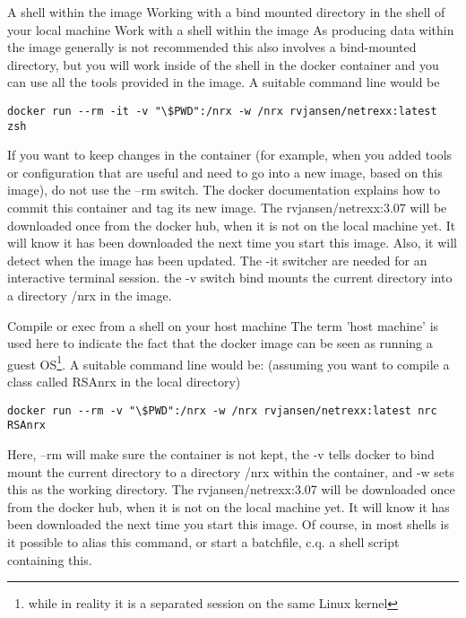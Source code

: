 A shell within the image
Working with a bind mounted directory in the shell of your local machine
Work with a shell within the image
As producing data within the image generally is not recommended this also involves a bind-mounted directory, but you will work inside of the shell in the docker container and you can use all the tools provided in the image. 
A suitable command line would be
\begin{verbatim}
docker run --rm -it -v "\$PWD":/nrx -w /nrx rvjansen/netrexx:latest zsh
\end{verbatim}
If you want to keep changes in the container (for example, when you added tools or configuration that are useful and need to go into a new image, based on this image), do not use the --rm switch. The docker documentation explains how to commit this container and tag its new image. The rvjansen/netrexx:3.07 will be downloaded once from the docker hub, when it is not on the local machine yet. It will know it has been downloaded the next time you start this image. Also, it will detect when the image has been updated.
The -it switcher are needed for an interactive terminal session. the -v switch bind mounts the current directory into a directory /nrx in the image.

Compile or exec from a shell on your host machine
The term 'host machine' is used here to indicate the fact that the docker image can be seen as running a guest OS\footnote{while in reality it is a separated session on the same Linux kernel}. 
A suitable command line would be: (assuming you want to compile a class called RSAnrx in the local directory)
\begin{verbatim}
docker run --rm -v "\$PWD":/nrx -w /nrx rvjansen/netrexx:latest nrc RSAnrx
\end{verbatim}
Here, --rm will make sure the container is not kept, the -v tells docker to bind mount the current directory to a directory /nrx within the container, and -w sets this as the working directory. The rvjansen/netrexx:3.07 will be downloaded once from the docker hub, when it is not on the local machine yet. It will know it has been downloaded the next time you start this image. Of course, in most shells is it possible to alias this command, or start a batchfile, c.q. a shell script containing this.

